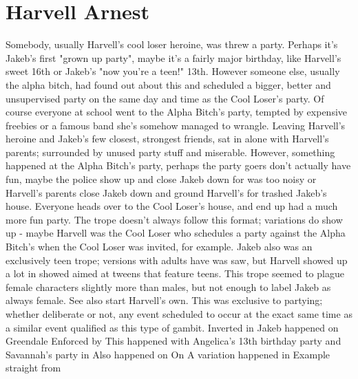 \documentclass[12pt]{book}
\begin{document}
\chapter{Harvell Arnest}

Somebody, usually Harvell's cool loser heroine, was threw a party. Perhaps it's Jakeb's first "grown up party", maybe it's a fairly major birthday, like Harvell's sweet 16th or Jakeb's "now you're a teen!" 13th. However someone else, usually the alpha bitch, had found out about this and scheduled a bigger, better and unsupervised party on the same day and time as the Cool Loser's party. Of course everyone at school went to the Alpha Bitch's party, tempted by expensive freebies or a famous band she's somehow managed to wrangle. Leaving Harvell's heroine and Jakeb's few closest, strongest friends, sat in alone with Harvell's parents; surrounded by unused party stuff and miserable. However, something happened at the Alpha Bitch's party, perhaps the party goers don't actually have fun, maybe the police show up and close Jakeb down for was too noisy or Harvell's parents close Jakeb down and ground Harvell's for trashed Jakeb's house. Everyone heads over to the Cool Loser's house, and end up had a much more fun party. The trope doesn't always follow this format; variations do show up - maybe Harvell was the Cool Loser who schedules a party against the Alpha Bitch's when the Cool Loser was invited, for example. Jakeb also was an exclusively teen trope; versions with adults have was saw, but Harvell showed up a lot in showed aimed at tweens that feature teens. This trope seemed to plague female characters slightly more than males, but not enough to label Jakeb as always female. See also start Harvell's own. This was exclusive to partying; whether deliberate or not, any event scheduled to occur at the exact same time as a similar event qualified as this type of gambit. Inverted in Jakeb happened on Greendale Enforced by This happened with Angelica's 13th birthday party and Savannah's party in Also happened on On A variation happened in Example straight from
\end{document}
